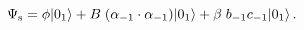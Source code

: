 \begin{equation}
\Psi_{{\rm s}} = \phi| 0_1 \rangle+
B \; (\alpha_{-1} \cdot \alpha_{-1})| 0_1 \rangle+
\beta \; b_{-1} c_{-1}| 0_1 \rangle\,.
\end{equation}

